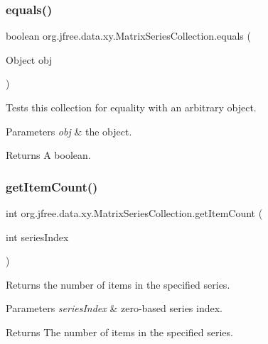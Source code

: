 \subsubsection{\texorpdfstring{equals()}{equals()}}
{\footnotesize\ttfamily boolean org.\+jfree.\+data.\+xy.\+Matrix\+Series\+Collection.\+equals (\begin{DoxyParamCaption}\item[{Object}]{obj }\end{DoxyParamCaption})}

Tests this collection for equality with an arbitrary object.


\begin{DoxyParams}{Parameters}
{\em obj} & the object.\\
\hline
\end{DoxyParams}
\begin{DoxyReturn}{Returns}
A boolean. 
\end{DoxyReturn}
\mbox{\label{classorg_1_1jfree_1_1data_1_1xy_1_1_matrix_series_collection_a2dd853641a952363c53c352046efb240}} 
\subsubsection{\texorpdfstring{get\+Item\+Count()}{getItemCount()}}
{\footnotesize\ttfamily int org.\+jfree.\+data.\+xy.\+Matrix\+Series\+Collection.\+get\+Item\+Count (\begin{DoxyParamCaption}\item[{int}]{series\+Index }\end{DoxyParamCaption})}

Returns the number of items in the specified series.


\begin{DoxyParams}{Parameters}
{\em series\+Index} & zero-\/based series index.\\
\hline
\end{DoxyParams}
\begin{DoxyReturn}{Returns}
The number of items in the specified series. 
\end{DoxyReturn}


